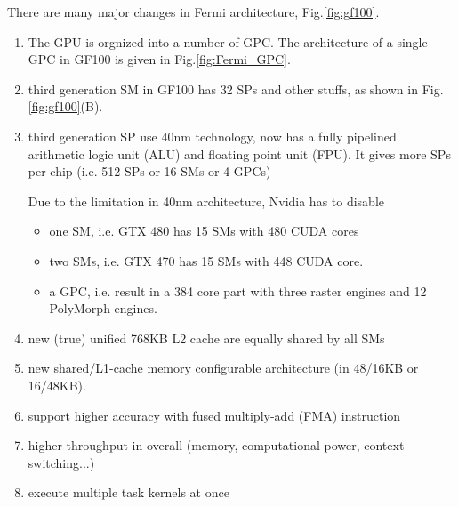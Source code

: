 
There are many major changes in Fermi architecture, Fig.\ref{fig:gf100}. 
\begin{enumerate}
\item The GPU is orgnized into a number of GPC. The architecture of a single GPC
in GF100 is given in Fig.\ref{fig:Fermi_GPC}.

\item third generation SM in GF100 has 32 SPs and other stuffs, as shown in
Fig.\ref{fig:gf100}(B).

\item third generation SP use 40nm technology, now has a fully
  pipelined arithmetic logic unit (ALU) and floating point unit
  (FPU). It gives more SPs per chip (i.e. 512 SPs or 16 SMs or 4 GPCs)

  \begin{framed}
    Due to the limitation in 40nm architecture, Nvidia has to disable
    \begin{itemize}
    \item one SM, i.e. GTX 480 has 15 SMs with 480 CUDA cores
    \item two SMs, i.e. GTX 470 has 15 SMs with 448 CUDA
      core.
    \item a GPC, i.e.  result in a 384 core part with three raster
      engines and 12 PolyMorph engines.
    \end{itemize}
  \end{framed}




\item new (true) unified 768KB L2 cache are equally shared by all SMs
\item new shared/L1-cache memory configurable architecture (in 48/16KB
  or 16/48KB).
\item support higher accuracy with fused multiply-add (FMA)
  instruction
\item higher throughput in overall (memory, computational power,
  context switching...)
\item execute multiple task kernels at once


\end{enumerate}
